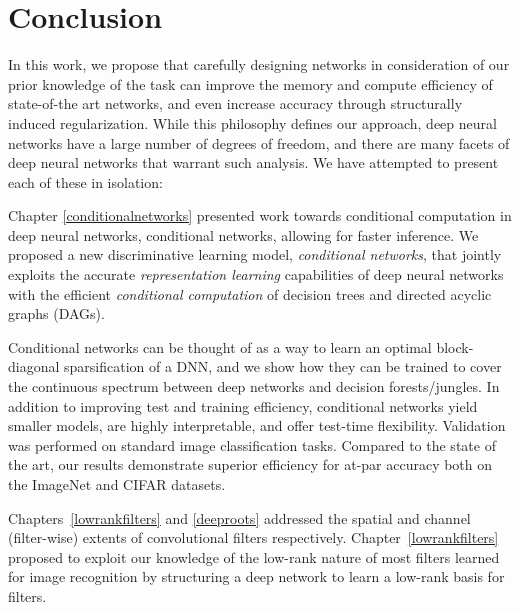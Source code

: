 \documentclass[thesis]{subfiles}
\begin{document}

\chapter{Conclusion}

In this work, we propose that carefully designing networks in consideration of our prior knowledge of the task can improve the memory and compute efficiency of state-of-the art networks, and even increase accuracy through structurally induced regularization. While this philosophy defines our approach, deep neural networks have a large number of degrees of freedom, and there are many facets of deep neural networks that warrant such analysis. We have attempted to present each of these in isolation:

Chapter \ref{conditionalnetworks} presented work towards conditional computation in deep neural networks, conditional networks, allowing for faster inference. We proposed a new discriminative learning model, \emph{conditional networks}, 
that jointly exploits the accurate \emph{representation learning} capabilities of deep neural networks with the efficient \emph{conditional computation} of decision trees and directed acyclic graphs (DAGs).

Conditional networks can be thought of as a way to learn an optimal block-diagonal sparsification of a DNN, and we show how they can be trained to cover the continuous spectrum between deep networks and decision forests/jungles. 
In addition to improving test and training efficiency, conditional networks yield smaller models, are highly interpretable, and offer test-time flexibility. Validation was performed on standard image classification tasks. Compared to the state of the art, our results demonstrate superior efficiency for at-par accuracy both on the ImageNet and CIFAR datasets.
	
    
Chapters~\ref{lowrankfilters} and \ref{deeproots} addressed the spatial and channel (filter-wise) extents of convolutional filters respectively. Chapter~\ref{lowrankfilters} proposed to exploit our knowledge of the low-rank nature of most filters learned for image recognition by structuring a deep network to learn a low-rank basis for filters.
\end{document}
